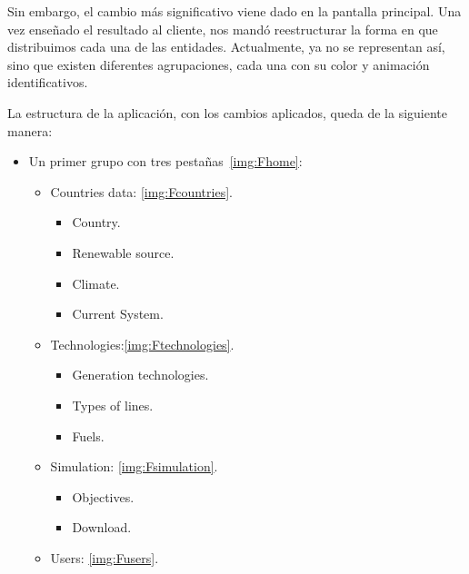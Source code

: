 Sin embargo, el cambio más significativo viene dado en la pantalla principal. Una vez enseñado el resultado al cliente, nos mandó reestructurar la forma en que distribuimos cada una de las entidades. Actualmente, ya no se representan así, sino que existen diferentes agrupaciones, cada una con su color y animación identificativos.

La estructura de la aplicación, con los cambios aplicados, queda de la siguiente manera:

\begin{itemize}
	
	\item Un primer grupo con tres pestañas~\ref{img:Fhome}:
	
	\begin{itemize}
		
		\item Countries data: \ref{img:Fcountries}. 
		
		\begin{itemize}
			
			\item Country.
			\item Renewable source.
			\item Climate.
			\item Current System.
			
		\end{itemize}
		
		\item Technologies:\ref{img:Ftechnologies}.
		
		\begin{itemize}
			
			\item Generation technologies.
			\item Types of lines.
			\item Fuels.
			
		\end{itemize}
		
		\item Simulation: \ref{img:Fsimulation}.
		
		\begin{itemize}
			
			\item Objectives.
			\item Download.
			
		\end{itemize}
	
		\item Users: \ref{img:Fusers}.
		
	\end{itemize}
	
\end{itemize}

